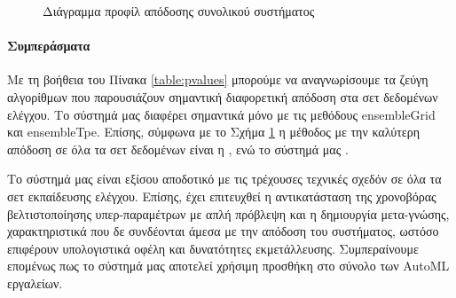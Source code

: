 	\begin{table}[!htb]
		\begin{center}
			\caption[Στατιστικό τεστ απόδοσης συνολικού συστήματος]{Ο πίνακας αυτός περιέχει τα p-values του post-hoc Nemenyi τεστ για τη διαπίστωση στατιστικής διαφοράς μεταξύ των διαφορετικών μεθόδων ανά ζεύγη. Το τεστ αυτό εφαρμόστηκε μετά από τη διαπίστωση στατιστικής διαφοράς με το Friedman rank sum τεστ. Με έντονη γραφή παρουσιάζονται τα ζεύγη τα οποία εμφανίζουν στατιστικά σημαντική διαφορά.}
		\end{center}
		\label{table:pvalues}	
	\end{table} 

\begin{figure}[!htb]
	
	\caption{Διάγραμμα προφίλ απόδοσης συνολικού συστήματος}
	\label{fig:systemprof}
\end{figure}
	
\paragraph{Συμπεράσματα}
Με τη βοήθεια του Πίνακα \ref{table:pvalues} μπορούμε να αναγνωρίσουμε τα ζεύγη αλγορίθμων που παρουσιάζουν σημαντική διαφορετική απόδοση στα σετ δεδομένων ελέγχου. Το σύστημά μας διαφέρει σημαντικά μόνο με τις μεθόδους ensembleGrid και ensembleTpe.
Επίσης, σύμφωνα με το Σχήμα \ref{fig:systemprof} η μέθοδος με την καλύτερη απόδοση σε όλα τα σετ δεδομένων είναι η , ενώ το σύστημά μας . 

Το σύστημά μας είναι εξίσου αποδοτικό με τις τρέχουσες τεχνικές σχεδόν σε όλα τα σετ εκπαίδευσης ελέγχου. Επίσης, έχει επιτευχθεί η αντικατάσταση της χρονοβόρας βελτιστοποίησης υπερ-παραμέτρων με απλή πρόβλεψη και η δημιουργία μετα-γνώσης, χαρακτηριστικά που δε συνδέονται άμεσα με την απόδοση του συστήματος, ωστόσο επιφέρουν υπολογιστικά οφέλη και δυνατότητες εκμετάλλευσης. Συμπεραίνουμε επομένως πως το σύστημά μας αποτελεί χρήσιμη προσθήκη στο σύνολο των \gls{AutoML} εργαλείων. 